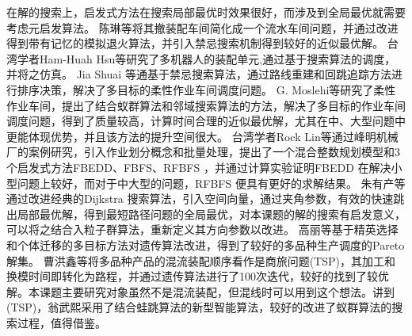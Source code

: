 在解的搜索上，启发式方法在搜索局部最优时效果很好，而涉及到全局最优就需要考虑元启发算法。
陈琳\cite{陈琳2009}等将其撤装配车间简化成一个流水车间问题，并通过改进得到带有记忆的模拟退火算法，并引入禁忌搜索机制得到较好的近似最优解。
台湾学者Ham-Huah Hsu\cite{hsu1995fully}等研究了多机器人的装配单元,通过基于搜索算法的调度，并将之仿真。
Jia Shuai\cite{jia2014path} 等通基于禁忌搜索算法，通过路线重建和回跳追踪方法进行排序决策，解决了多目标的柔性作业车间调度问题。
G. Moslehi\cite{moslehi2011pareto}等研究了柔性作业车间，提出了结合蚁群算法和邻域搜索算法的方法，解决了多目标的作业车间调度问题，得到了质量较高，计算时间合理的近似最优解，尤其在中、大型问题中更能体现优势，并且该方法的提升空间很大。
台湾学者Rock Lin\cite{lin2012case}等通过峰明机械厂的案例研究，引入作业划分概念和批量处理，提出了一个混合整数规划模型和3个启发式方法FBEDD、FBFS、RFBFS ，并通过计算实验证明FBEDD 在解决小型问题上较好，而对于中大型的问题，RFBFS 便具有更好的求解结果。
朱有产\cite{朱有产2006}等通过改进经典的Dijkstra 搜索算法，引入空间向量，通过夹角参数，有效的快速跳出局部最优解，得到最短路径问题的全局最优，对本课题的解的搜索有启发意义，可以将之结合入粒子群算法，重新定义其方向参数以改进。
高丽\cite{高丽2012}等基于精英选择和个体迁移的多目标方法对遗传算法改进，得到了较好的多品种生产调度的Pareto 解集。
曹洪鑫\cite{曾洪鑫2006}等将多品种产品的混流装配顺序看作是商旅问题(TSP)，其加工和换模时间即转化为路程，并通过遗传算法进行了100次迭代，较好的找到了较优解。本课题主要研究对象虽然不是混流装配，但混线时可以用到这个想法。讲到(TSP)，翁武熙\cite{翁武熙2012混合蚁群算法求解}采用了结合蛙跳算法的新型智能算法，较好的改进了蚁群算法的搜索过程，值得借鉴。